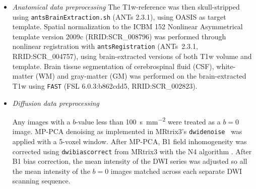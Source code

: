 \documentclass[fleqn,10pt,inline]{wlscirep}
\begin{document}
\begin{itemize}

\item {\it Anatomical data preprocessing}
The T1w-reference was then skull-stripped
using \texttt{antsBrainExtraction.sh} (ANTs 2.3.1), using OASIS as target
template. Spatial normalization to the ICBM 152 Nonlinear Asymmetrical template
version 2009c (RRID:SCR\_008796)\cite{mni} was performed through nonlinear
registration with \texttt{antsRegistration} (ANTs~2.3.1,
RRID:SCR\_004757)\cite{ants}, using brain-extracted versions of both T1w volume and
template. Brain tissue segmentation of cerebrospinal fluid (CSF), white-matter
(WM) and gray-matter (GM) was performed on the brain-extracted T1w using
\texttt{FAST} (FSL 6.0.3:b862cdd5, RRID:SCR\_002823)\cite{fsl-fast}.

\item {\it Diffusion data preprocessing}

Any images with a $b$-value less than \qty{100}{\second \per \mm^{2}} were treated
as a $b=0$ image. MP-PCA denoising as implemented in MRtrix3's \texttt{dwidenoise}~\cite{dwidenoise1} was applied with a 5-voxel window. After
MP-PCA, B1 field inhomogeneity was corrected using \texttt{dwibiascorrect} from
MRtrix3 with the N4 algorithm \cite{n4}. After B1 bias correction, the mean
intensity of the DWI series was adjusted so all the mean intensity of the $b=0$
images matched across each separate DWI scanning sequence.


\end{itemize}
\end{document}
